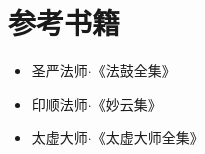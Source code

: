 \chapter{参考书籍}
\begin{itemize}
  \item 圣严法师$\cdot$《法鼓全集》
  \item 印顺法师$\cdot$《妙云集》
  \item 太虚大师$\cdot$《太虚大师全集》      
\end{itemize}
